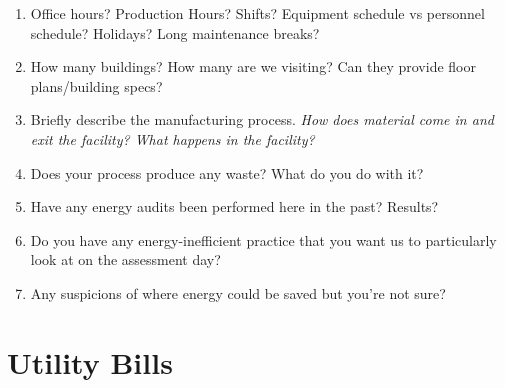 \documentclass[./main.tex]{subfiles}
\begin{document}
\begin{enumerate}[leftmargin=*]
\item Office hours? Production Hours? Shifts? Equipment schedule vs personnel schedule? Holidays? Long maintenance breaks?

\vspace{\answerspace}

\item How many buildings? How many are we visiting? Can they provide floor plans/building specs?

\clearpage

\item Briefly describe the manufacturing process. \emph{How does material come in and exit the facility? What happens in the facility? }

\vspace{\answerspace} \vspace{\answerspace} \vspace{\answerspace} 

\item Does your process produce any waste? What do you do with it? 

\vspace{\answerspace}

\item Have any energy audits been performed here in the past? Results?

\vspace{\answerspace}

\item Do you have any energy-inefficient practice that you want us to particularly look at on the assessment day?

\vspace{\answerspace}

\item Any suspicions of where energy could be saved but you're not sure?

\vspace{\answerspace}


\end{enumerate}

\section*{Utility Bills}
\end{document}
